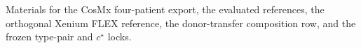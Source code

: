 Materials for the CosMx four-patient export, the evaluated references, the orthogonal Xenium FLEX reference, the donor-transfer composition row, and the frozen type-pair and \(c^\star\) locks.
